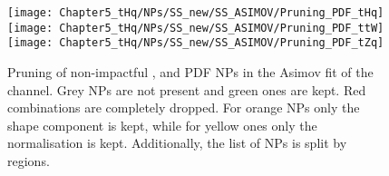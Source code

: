 \begin{figure}[h]
  \centering
   \texttt{[image: Chapter5\_tHq/NPs/SS\_new/SS\_ASIMOV/Pruning\_PDF\_tHq]}\hfill
   \texttt{[image: Chapter5\_tHq/NPs/SS\_new/SS\_ASIMOV/Pruning\_PDF\_ttW]}\hfill
   \texttt{[image: Chapter5\_tHq/NPs/SS\_new/SS\_ASIMOV/Pruning\_PDF\_tZq]}
   \caption{Pruning of non-impactful \tHq, \ttW and \tZq PDF NPs in the Asimov fit of the \dilepSStau channel. Grey NPs are 
   not present and green ones are kept. Red combinations are completely dropped. For orange NPs only the shape 
   component is kept, while for yellow ones only the normalisation is kept. Additionally, the list of NPs is split by regions.}
  \label{fig:Appendix:AdditionalResults:SS:Asimov:Pruning:tHqPDF}
\end{figure}






